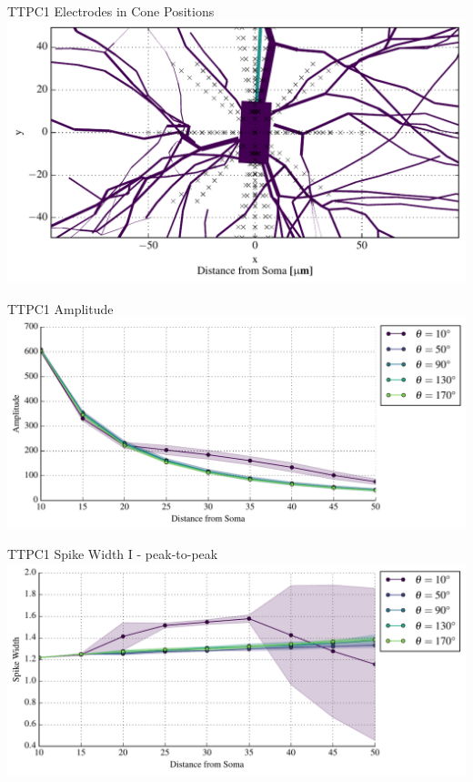 \documentclass{beamer}
\begin{document}
\begin{frame}{TTPC1 Electrodes in Cone Positions}{}
    \centering
    \includegraphics[width=1.0\textwidth]{images/sym_morph_elec.pdf}
\end{frame}

\begin{frame}{TTPC1 Amplitude}{}
    \centering
    \includegraphics[width=1.0\textwidth]{images/sym_spike_amps_II.pdf}
\end{frame}

\begin{frame}{TTPC1 Spike Width I - peak-to-peak}{}
    \centering
    \includegraphics[width=1.0\textwidth]{images/sym_spike_width_I.pdf}
\end{frame}
\end{document}
